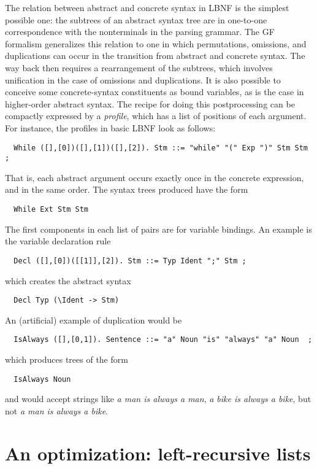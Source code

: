 \documentclass[10pt]{article}
\begin{document}
The relation between abstract and concrete syntax in LBNF is the
simplest possible one: the subtrees of an abstract syntax tree
are in one-to-one correspondence with the nonterminals in
the parsing grammar. The GF formalism generalizes this relation to one in which
permutations, omissions, and duplications can occur in the
transition from abstract and concrete syntax. The way back
then requires a rearrangement of the subtrees, which involves
unification in the case of omissions and duplications.
It is also possible to conceive some concrete-syntax constituents
as bound variables, as is the case in higher-order abstract syntax.
The recipe for doing this postprocessing can be compactly
expressed by a \textit{profile}, which has a list of positions
of each argument. For instance, the profiles in basic LBNF look
as follows:
\begin{verbatim}
  While ([],[0])([],[1])([],[2]). Stm ::= "while" "(" Exp ")" Stm Stm ;
\end{verbatim}
That is, each abstract argument occurs exactly once in the concrete
expression, and in the same order. The syntax trees produced have the form
\begin{verbatim}
  While Ext Stm Stm
\end{verbatim}
The first components in each list of pairs
are for variable bindings. An example is the
variable declaration rule
\begin{verbatim}
  Decl ([],[0])([[1]],[2]). Stm ::= Typ Ident ";" Stm ;
\end{verbatim}
which creates the abstract syntax
\begin{verbatim}
  Decl Typ (\Ident -> Stm)
\end{verbatim}
An (artificial) example of duplication would be
\begin{verbatim}
  IsAlways ([],[0,1]). Sentence ::= "a" Noun "is" "always" "a" Noun  ;
\end{verbatim}
which produces trees of the form
\begin{verbatim}
  IsAlways Noun
\end{verbatim}
and would accept strings like \textit{a man is always a man},
\textit{a bike is always a bike}, but not \textit{a man is always a bike}.


\section{An optimization: left-recursive lists}

\label{leftrec}
\end{document}
